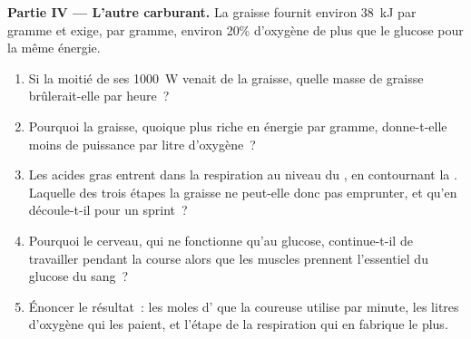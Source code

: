 \begin{problem}
\medskip
\noindent\textbf{Partie IV --- L'autre carburant.}
La graisse fournit environ \qty{38}{kJ} par gramme et exige, par
gramme, environ 20\% d'oxygène de plus que le glucose pour la même
énergie.
\begin{enumerate}[resume]
  \item Si la moitié de ses \qty{1000}{W} venait de la graisse, quelle
        masse de graisse brûlerait-elle par heure~?
  \item Pourquoi la graisse, quoique plus riche en énergie par gramme,
        donne-t-elle moins de puissance par litre d'oxygène~?
  \item Les acides gras entrent dans la respiration au niveau du , en contournant la . Laquelle des trois
        étapes la graisse ne peut-elle donc pas emprunter, et qu'en
        découle-t-il pour un sprint~?
  \item Pourquoi le cerveau, qui ne fonctionne qu'au glucose,
        continue-t-il de travailler pendant la course alors que les
        muscles prennent l'essentiel du glucose du sang~?
  \item Énoncer le résultat~: les moles d' que la coureuse utilise
        par minute, les litres d'oxygène qui les paient, et l'étape de
        la respiration qui en fabrique le plus.
\end{enumerate}
\end{problem}

